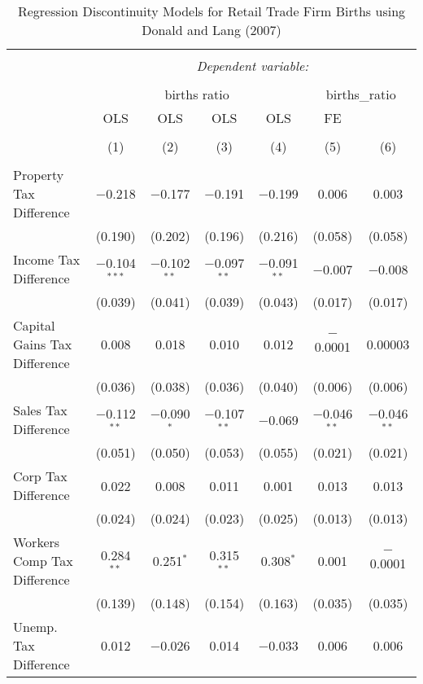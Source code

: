 
\begin{table}[!htbp] \centering 
  \caption{Regression Discontinuity Models for  Retail Trade Firm Births using Donald and Lang (2007)} 
  \label{} 
\begin{tabular}{@{\extracolsep{5pt}}lcccccc} 
\\[-1.8ex]\hline 
\hline \\[-1.8ex] 
 & \multicolumn{6}{c}{\textit{Dependent variable:}} \\ 
\cline{2-7} 
\\[-1.8ex] & \multicolumn{4}{c}{births ratio} & \multicolumn{2}{c}{births\_ratio} \\ 
 & OLS & OLS & OLS & OLS & FE &  \\ 
\\[-1.8ex] & (1) & (2) & (3) & (4) & (5) & (6)\\ 
\hline \\[-1.8ex] 
 Property Tax Difference & $-$0.218 & $-$0.177 & $-$0.191 & $-$0.199 & 0.006 & 0.003 \\ 
  & (0.190) & (0.202) & (0.196) & (0.216) & (0.058) & (0.058) \\ 
  Income Tax Difference & $-$0.104$^{***}$ & $-$0.102$^{**}$ & $-$0.097$^{**}$ & $-$0.091$^{**}$ & $-$0.007 & $-$0.008 \\ 
  & (0.039) & (0.041) & (0.039) & (0.043) & (0.017) & (0.017) \\ 
  Capital Gains Tax Difference & 0.008 & 0.018 & 0.010 & 0.012 & $-$0.0001 & 0.00003 \\ 
  & (0.036) & (0.038) & (0.036) & (0.040) & (0.006) & (0.006) \\ 
  Sales Tax Difference & $-$0.112$^{**}$ & $-$0.090$^{*}$ & $-$0.107$^{**}$ & $-$0.069 & $-$0.046$^{**}$ & $-$0.046$^{**}$ \\ 
  & (0.051) & (0.050) & (0.053) & (0.055) & (0.021) & (0.021) \\ 
  Corp Tax Difference & 0.022 & 0.008 & 0.011 & 0.001 & 0.013 & 0.013 \\ 
  & (0.024) & (0.024) & (0.023) & (0.025) & (0.013) & (0.013) \\ 
  Workers Comp Tax Difference & 0.284$^{**}$ & 0.251$^{*}$ & 0.315$^{**}$ & 0.308$^{*}$ & 0.001 & $-$0.0001 \\ 
  & (0.139) & (0.148) & (0.154) & (0.163) & (0.035) & (0.035) \\ 
  Unemp. Tax Difference & 0.012 & $-$0.026 & 0.014 & $-$0.033 & 0.006 & 0.006 \\ 

\end{tabular}
\end{table}
